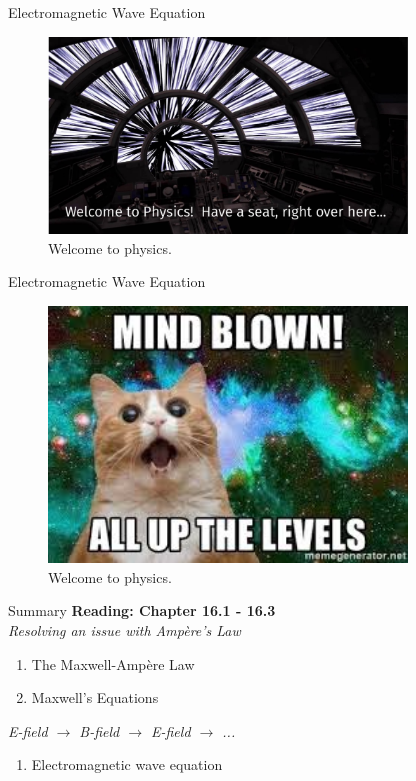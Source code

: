 \documentclass{beamer}
\begin{document}
\begin{frame}{Electromagnetic Wave Equation}
\begin{figure}
\centering
\includegraphics[width=0.85\textwidth]{figures/hyper.pdf}
\caption{\label{fig:hyper} Welcome to physics.}
\end{figure}
\end{frame}

\begin{frame}{Electromagnetic Wave Equation}
\begin{figure}
\centering
\includegraphics[width=0.85\textwidth]{figures/cat.jpeg}
\caption{\label{fig:cat} Welcome to physics.}
\end{figure}
\end{frame}

\begin{frame}{Summary}
\textbf{Reading: Chapter 16.1 - 16.3} \\ \vspace{0.5cm}
\textit{Resolving an issue with Amp\`{e}re's Law}
\begin{enumerate}
\item The Maxwell-Amp\`{e}re Law
\item Maxwell's Equations
\end{enumerate}
\textit{E-field $\rightarrow$ B-field $\rightarrow$ E-field $\rightarrow$ ...}
\begin{enumerate}
\item Electromagnetic wave equation
\end{enumerate}
\end{frame}
\end{document}
